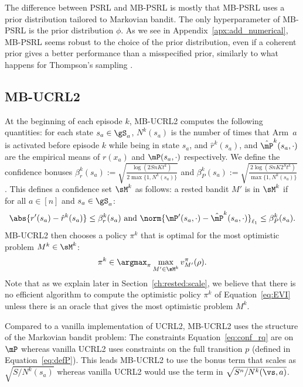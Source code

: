 The difference between PSRL and MB-PSRL is mostly that MB-PSRL uses a prior distribution tailored to Markovian bandit.  The only hyperparameter of MB-PSRL is the prior distribution $\phi$. As we see in Appendix~\ref{apx:add_numerical},
MB-PSRL seems robust to the choice of the prior distribution, even if a
coherent prior gives a better performance than a misspecified prior, similarly
to what happens for Thompson's sampling \cite{russo2018tutorial}. 

\subsection{MB-UCRL2}
At the beginning of each episode $k$, MB-UCRL2 computes the following quantities: for each state $s_a\in\gS_a$, $N^{k}(s_a)$ is the number of times that Arm~$a$ is activated before episode $k$ while being in state $s_a$, and $\hat{r}^{k}(s_a)$, and $\hat{\mP}^{k}(s_a,\cdot)$ are the empirical means of $r(x_a)$ and $\mP(s_a,\cdot)$ respectively. We define the confidence bonuses
$\beta_r^{k}(s_a):=\sqrt{\frac{\log(2SnKt^{k})}{2\max\{1,N^{k}(s_a)\}}}$
and
$\beta_P^{k}(s_a):=\sqrt{\frac{2\log(SnK2^St^k)}{\max\{1,N^{k}(s_a)\}}}$.
This defines a confidence set $\sM^k$  as follows: a rested bandit $M'$
is in $\sM^k$ if for all $a\in[n]$ and $s_a\in\gS_a$: 
\begin{align}
    \label{eq:conf_rq}
    \abs{r'(s_a) - \hat{r}^{k}(s_a)} \le \beta_r^{k}(s_a) \text{ and }
    \norm{{\mP'}(s_a,\cdot) - \hat{\mP}^{k}(s_a,\cdot)}_{\ell_1} \le \beta_P^{k}(s_a).            
\end{align}
MB-UCRL2 then chooses a policy $\pi^k$ that is optimal for the most optimistic problem $M^k\in\sM^k$:
\begin{align}
    \pi^k \in \argmax_{\pi} \max_{M'\in\sM^k}v^{\pi}_{M'}(\rho).
    \label{eq:EVI}
\end{align}
Note that as we explain later in Section~\ref{ch:rested:scale}, we believe that there is no  efficient algorithm to compute the optimistic policy $\pi^k$ of Equation~\eqref{eq:EVI} unless there is an oracle that gives the most optimistic problem $M^k$.

Compared to a vanilla implementation of UCRL2, MB-UCRL2 uses the structure of the Markovian bandit problem: The constraints Equation~\eqref{eq:conf_rq} are on $\mP$ whereas vanilla UCRL2 uses constraints on the full transition $p$ (defined in Equation~\eqref{eq:defP}). This leads MB-UCRL2 to use the bonus term that scales as $\sqrt{S/N^{k}(s_a)}$ whereas vanilla UCRL2 would use the term in $\sqrt{S^n/N^{k}(\vs, a)}$.

